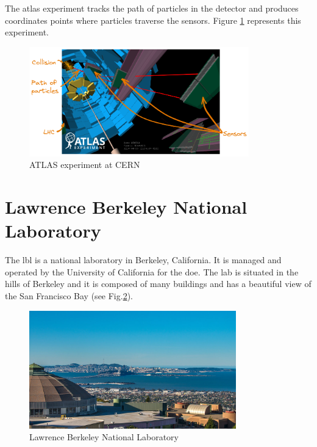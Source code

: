 The \acrfull{atlas} experiment tracks the path of particles in the detector and produces coordinates points where particles traverse the sensors.
Figure \ref{spec:fig:context:physics-simulation:lhc} represents this experiment.
\begin{figure}[ht]
    \centering
    \includegraphics[width=0.85\textwidth]{05-resources/img/spec/experiment-atlas.excalidraw.png}
    \caption{ATLAS experiment at CERN~\cite{atlas-experiment}}
    \label{spec:fig:context:physics-simulation:lhc}
\end{figure}


\section{Lawrence Berkeley National Laboratory}
\label{spec:ch:context:lbl}

The \acrfull{lbl} is a national laboratory in Berkeley, California.
It is managed and operated by the University of California for the \acrfull{doe}.
The lab is situated in the hills of Berkeley and it is composed of many buildings and has a beautiful view of the San Francisco Bay (see Fig.\ref{spec:fig:context:lbl:lab-view}).

\begin{figure}[ht]
    \centering
    \includegraphics[width=0.8\textwidth]{05-resources/img/spec/lab-view.jpg}
    \caption{Lawrence Berkeley National Laboratory}
    \label{spec:fig:context:lbl:lab-view}
\end{figure}


